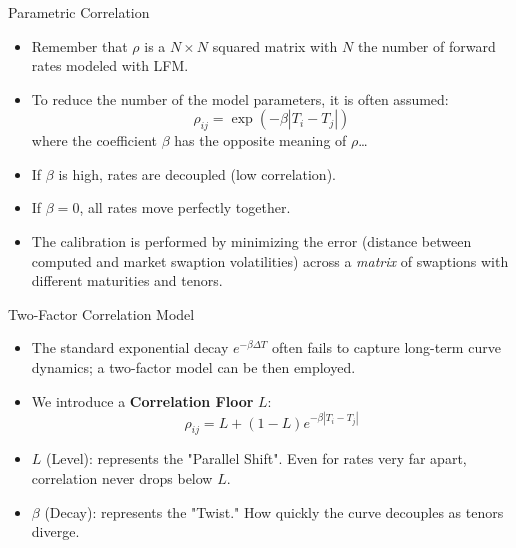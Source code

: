\documentclass{beamer}
\begin{document}
\begin{frame}{Parametric Correlation}
	\begin{itemize}
		\item Remember that $\rho$ is a $N\times N$ squared matrix with $N$ the number of forward rates modeled with LFM.
		\item To reduce the number of the model parameters, it is often assumed:
		\begin{equation*}
			\rho_{ij} = \exp(-\beta |T_i - T_j|)
		\end{equation*}
		where the coefficient $\beta$ has the opposite meaning of $\rho$\ldots
		\item If $\beta$ is high, rates are decoupled (low correlation).
		\item If $\beta = 0$, all rates move perfectly together.
		\item The calibration is performed by minimizing the error (distance between computed and market swaption volatilities) across a \textit{matrix} of swaptions with different maturities and tenors.
	\end{itemize}
\end{frame}

\begin{frame}{Two-Factor Correlation Model}
	\begin{itemize}
	\item The standard exponential decay $e^{-\beta \Delta T}$ often fails to capture long-term curve dynamics; a two-factor model can be then employed.
	\item We introduce a \textbf{Correlation Floor} $L$:
	\begin{equation*}
		\rho_{ij} = L + (1 - L)e^{-\beta |T_i - T_j|}
	\end{equation*}
	\item $L$ (Level): represents the "Parallel Shift". Even for rates very far apart, correlation never drops below $L$.
	\item $\beta$ (Decay): represents the "Twist." How quickly the curve decouples as tenors diverge.
	\end{itemize}
\end{frame}
\end{document}

